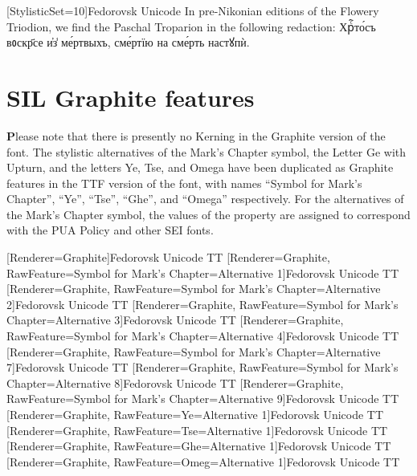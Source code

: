 \newfontfamily{\base}[StylisticSet=10]{Fedorovsk Unicode}
{\Large \base
In pre-Nikonian editions of the Flowery Triodion, we find the Paschal Troparion in the following redaction: Хрⷭ҇то́съ вᲂскр҃се и҆з̾ ме́ртвыхъ, сме́ртїю на сме́рть настꙋпѝ.
}

\section{SIL Graphite features}

{\textbf Please note} that there is presently no Kerning in the Graphite version of the font. The stylistic alternatives of the Mark's Chapter symbol, the Letter Ge with Upturn, and the letters Ye, Tse, and Omega have been duplicated as Graphite features in the TTF version of the font, with names ``Symbol for Mark's Chapter'', ``Ye'', ``Tse'', ``Ghe'', and ``Omega'' respectively. For the alternatives of the Mark's Chapter symbol, the values of the property are assigned to correspond with the PUA Policy and other SEI fonts.

\newfontfamily{\graph}[Renderer=Graphite]{Fedorovsk Unicode TT}
\newfontfamily{\graphA}[Renderer=Graphite, RawFeature={Symbol for Mark's Chapter=Alternative 1}]{Fedorovsk Unicode TT}
\newfontfamily{\graphB}[Renderer=Graphite, RawFeature={Symbol for Mark's Chapter=Alternative 2}]{Fedorovsk Unicode TT}
\newfontfamily{\graphC}[Renderer=Graphite, RawFeature={Symbol for Mark's Chapter=Alternative 3}]{Fedorovsk Unicode TT}
\newfontfamily{\graphD}[Renderer=Graphite, RawFeature={Symbol for Mark's Chapter=Alternative 4}]{Fedorovsk Unicode TT}
\newfontfamily{\graphE}[Renderer=Graphite, RawFeature={Symbol for Mark's Chapter=Alternative 7}]{Fedorovsk Unicode TT}
\newfontfamily{\graphF}[Renderer=Graphite, RawFeature={Symbol for Mark's Chapter=Alternative 8}]{Fedorovsk Unicode TT}
\newfontfamily{\graphG}[Renderer=Graphite, RawFeature={Symbol for Mark's Chapter=Alternative 9}]{Fedorovsk Unicode TT}
\newfontfamily{\graphYe}[Renderer=Graphite, RawFeature={Ye=Alternative 1}]{Fedorovsk Unicode TT}
\newfontfamily{\graphTse}[Renderer=Graphite, RawFeature={Tse=Alternative 1}]{Fedorovsk Unicode TT}
\newfontfamily{\graphGhe}[Renderer=Graphite, RawFeature={Ghe=Alternative 1}]{Fedorovsk Unicode TT}
\newfontfamily{\graphOmega}[Renderer=Graphite, RawFeature={Omeg=Alternative 1}]{Fedorovsk Unicode TT}

